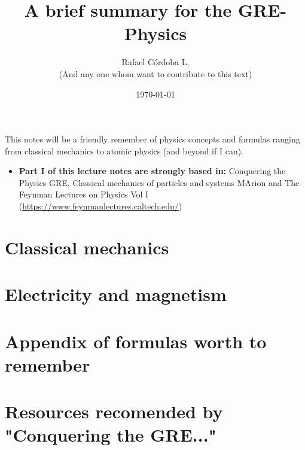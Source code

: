 \documentclass[twoside]{scrarticle}
\title{A brief summary for the GRE-Physics}
\author{Rafael Córdoba L.\\
(And any one whom want to contribute to this text) }
\date{\today}
\begin{document}
\maketitle

This notes will be a friendly remember of physics concepts and formulas ranging from classical mechanics to atomic physics (and beyond if I can).

\begin{itemize}[leftmargin=*,noitemsep]
  \item[] \textbf{Part I of this lecture notes are strongly based in: } Conquering the Physics GRE, Classical mechanics of particles and systems MArion and The Feynman Lectures on Physics Vol I (\hyperlink{Lecture notes heare}{https://www.feynmanlectures.caltech.edu/})
\end{itemize}
\tableofcontents

\part{Classical mechanics}

\part{Electricity and magnetism}


\part{Appendix of formulas worth to remember}

\part{Resources recomended by "Conquering the GRE..."}

\end{document}
